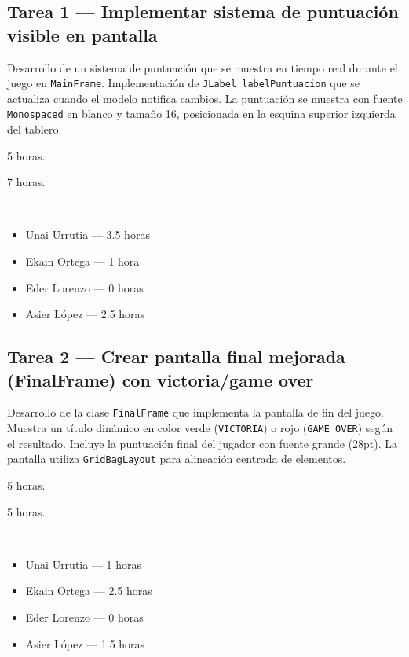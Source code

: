 \documentclass[12pt, a4paper]{article}
\begin{document}
\subsection*{Tarea 1 — Implementar sistema de puntuación visible en pantalla}
\begin{description}[leftmargin=2em, style=nextline]
    \item[\textbf{Descripción:}] Desarrollo de un sistema de puntuación que se muestra en tiempo real durante el juego en \texttt{MainFrame}. Implementación de \texttt{JLabel labelPuntuacion} que se actualiza cuando el modelo notifica cambios. La puntuación se muestra con fuente \texttt{Monospaced} en blanco y tamaño 16, posicionada en la esquina superior izquierda del tablero.
    \item[\textbf{Tiempo estimado:}] 5 horas.
    \item[\textbf{Tiempo real:}] 7 horas.
    \item[\textbf{Responsables y dedicación:}]~
        \begin{itemize}[leftmargin=1em, nosep]
            \item Unai Urrutia — 3.5 horas
            \item Ekain Ortega — 1 hora
            \item Eder Lorenzo — 0 horas
            \item Asier López — 2.5 horas
        \end{itemize}
\end{description}

\vspace{0.8em}

\subsection*{Tarea 2 — Crear pantalla final mejorada (FinalFrame) con victoria/game over}
\begin{description}[leftmargin=2em, style=nextline]
    \item[\textbf{Descripción:}] Desarrollo de la clase \texttt{FinalFrame} que implementa la pantalla de fin del juego. Muestra un título dinámico en color verde (\texttt{VICTORIA}) o rojo (\texttt{GAME OVER}) según el resultado. Incluye la puntuación final del jugador con fuente grande (28pt). La pantalla utiliza \texttt{GridBagLayout} para alineación centrada de elementos.
    \item[\textbf{Tiempo estimado:}] 5 horas.
    \item[\textbf{Tiempo real:}] 5 horas.
    \item[\textbf{Responsables y dedicación:}]~
        \begin{itemize}[leftmargin=1em, nosep]
            \item Unai Urrutia — 1 horas
            \item Ekain Ortega — 2.5 horas
            \item Eder Lorenzo — 0 horas
            \item Asier López — 1.5 horas
        \end{itemize}
\end{description}
\end{document}

